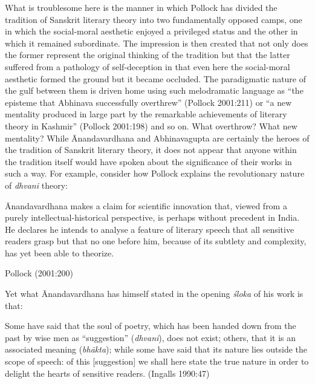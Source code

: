 What is troublesome here is the manner in which Pollock has divided the tradition of Sanskrit literary theory into two fundamentally opposed camps, one in which the social-moral aesthetic enjoyed a privileged status and the other in which it remained subordinate. The impression is then created that not only does the former represent the original thinking of the tradition but that the latter suffered from a pathology of self-deception in that even here the social-moral aesthetic formed the ground but it became occluded. The paradigmatic nature of the gulf between them is driven home using such melodramatic language as ``the episteme that Abhinava successfully overthrew'' (Pollock 2001:211) or ``a new mentality produced in large part by the remarkable achievements of literary theory in Kashmir'' (Pollock 2001:198) and so on. What overthrow? What new mentality? While Ānandavardhana and Abhinavagupta are certainly the heroes of the tradition of Sanskrit literary theory, it does not appear that anyone within the tradition itself would have spoken about the significance of their works in such a way. For example, consider how Pollock explains the revolutionary nature of \textsl{dhvani} theory:  

\begin{myquote}
Ānandavardhana makes a claim for scientific innovation that, viewed from a purely intellectual-historical perspective, is perhaps without precedent in India. He declares he intends to analyse a feature of literary speech that all sensitive readers grasp but that no one before him, because of its subtlety and complexity, has yet been able to theorize. 

\hfill Pollock (2001:200)
\end{myquote}

Yet what Ānandavardhana has himself stated in the opening \textsl{śloka} of his work is that:

\begin{myquote}
Some have said that the soul of poetry, which has been handed down from the past by wise men as ``suggestion'' (\textsl{dhvani}), does not exist; others, that it is an associated meaning (\textsl{bhākta}); while some have said that its nature lies outside the scope of speech: of this [suggestion] we shall here state the true nature in order to delight the hearts of sensitive readers. 
\hfill (Ingalls 1990:47)
\end{myquote}

